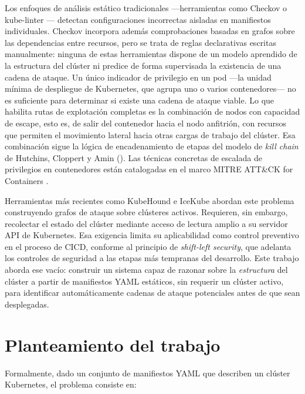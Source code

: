 Los enfoques de análisis estático tradicionales —herramientas como Checkov
\citep{Checkov2021} o kube-linter \citep{KubeLinter2021}— detectan
configuraciones incorrectas aisladas en manifiestos individuales. Checkov
incorpora además comprobaciones basadas en grafos sobre las dependencias entre recursos,
pero se trata de reglas declarativas escritas manualmente: ninguna de estas herramientas
dispone de un modelo aprendido de la estructura del clúster ni predice de forma
supervisada la existencia de una cadena de ataque.
Un único indicador de privilegio en un pod —la unidad mínima de despliegue de
Kubernetes, que agrupa uno o varios contenedores— no es suficiente para
determinar si existe una cadena de ataque viable. Lo que habilita rutas de
explotación completas es la combinación de nodos con capacidad de escape, esto
es, de salir del contenedor hacia el nodo anfitrión, con recursos que permiten el
movimiento lateral hacia otras cargas de trabajo del clúster. Esa combinación
sigue la lógica de encadenamiento de etapas del modelo de \textit{kill chain} de
Hutchins, Cloppert y Amin (\citeyear{Hutchins2011}). Las técnicas concretas de
escalada de privilegios en contenedores están catalogadas en el marco MITRE
ATT\&CK for Containers \citep{MITRE2021Containers}.

Herramientas más recientes como KubeHound \citep{KubeHound2023} e
IceKube \citep{IceKube2023} abordan este problema construyendo grafos de
ataque sobre clústeres activos. Requieren, sin embargo, recolectar el estado del
clúster mediante acceso de lectura amplio a su servidor \acs{API} de Kubernetes.
Esa exigencia limita su aplicabilidad como control preventivo en el proceso de
\acs{CICD}, conforme al principio de \textit{shift-left security}, que adelanta
los controles de seguridad a las etapas más tempranas del desarrollo. Este
trabajo aborda ese vacío: construir
un sistema capaz de razonar sobre la \emph{estructura} del clúster a partir de
manifiestos \acs{YAML} estáticos, sin requerir un clúster activo, para identificar
automáticamente cadenas de ataque potenciales antes de que sean desplegadas.

\section{Planteamiento del trabajo}

Formalmente, dado un conjunto de manifiestos \acs{YAML} que describen un clúster
Kubernetes, el problema consiste en:

